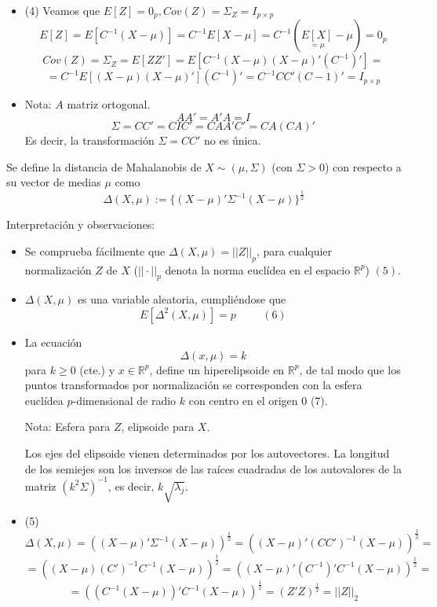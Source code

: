\documentclass[11pt,a4paper]{article}
\begin{document}
\begin{itemize}
\begin{enumerate}[label=(\Alph*)]
\begin{itemize}
\item (4) Veamos que $E[Z] = 0_{p}, Cov(Z) = \Sigma_{Z} = I_{p \times p}$
$$E[Z] = E[C^{-1}(X-\mu)] = C^{-1}E[X-\mu] = C^{-1}(\underset{= \mu}{E[X]} - \mu) = 0_{p}$$
$$Cov(Z) = \Sigma_{Z} = E[ZZ'] = E[C^{-1}(X-\mu)(X-\mu)'(C^{-1})'] =$$
$$= C^{-1}E[(X-\mu)(X-\mu)'](C^{-1})' = C^{-1}C C'(C-1)' = I_{p \times p}$$

\item Nota: $A$ matriz ortogonal.
$$AA' = A'A = I$$
$$\Sigma = CC' = CIC' = CAA'C' = CA(CA)'$$
Es decir, la transformación $\Sigma = CC'$ no es única.
\end{itemize}

Se define la distancia de Mahalanobis de $X \sim (\mu, \Sigma)$ (con $\Sigma > 0$) con respecto a su vector de medias $\mu$ como
$$\Delta(X, \mu) := \{(X - \mu)' \Sigma^{-1} (X - \mu)\}^{\frac{1}{2}}$$

Interpretación y observaciones:
\begin{itemize}
\item Se comprueba fácilmente que $\Delta(X, \mu) = ||Z||_{p}$, para cualquier normalización $Z$ de $X$ ($||\cdot||_{p}$ denota la norma euclídea en el espacio $\mathbb{R}^{p}$) $(5)$.

\item $\Delta(X, \mu)$ es una variable aleatoria, cumpliéndose que
$$E[\Delta^{2}(X, \mu)] = p \hspace{1cm} (6)$$

\item La ecuación
$$\Delta(x, \mu) = k$$
para $k \geq 0$ (cte.) y $x \in \mathbb{R}^{p}$, define un hiperelipsoide en $\mathbb{R}^{p}$, de tal modo que los puntos transformados por normalización se corresponden con la esfera euclídea $p$-dimensional de radio $k$ con centro en el origen 0 (7).

Nota: Esfera para $Z$, elipsoide para $X$.

Los ejes del elipsoide vienen determinados por los autovectores. La longitud de los semiejes son los inversos de las raíces cuadradas de los autovalores de la matriz $(k^{2}\Sigma)^{-1}$, es decir, $k\sqrt{\lambda_{j}}$.

\item (5) $$\Delta(X, \mu) = ((X - \mu)' \Sigma^{-1} (X - \mu))^{\frac{1}{2}} = ((X - \mu)' (CC')^{-1} (X - \mu))^{\frac{1}{2}} =$$
$$= ((X - \mu) (C')^{-1} C^{-1} (X-\mu))^{\frac{1}{2}} = ((X - \mu)' (C^{-1})' C^{-1} (X - \mu))^{\frac{1}{2}} =$$
$$= ((C^{-1}(X - \mu))' C^{-1} (X - \mu))^{\frac{1}{2}} = (Z'Z)^{\frac{1}{2}} = ||Z||_{2}$$


\end{itemize}
\end{enumerate}
\end{itemize}
\end{document}
